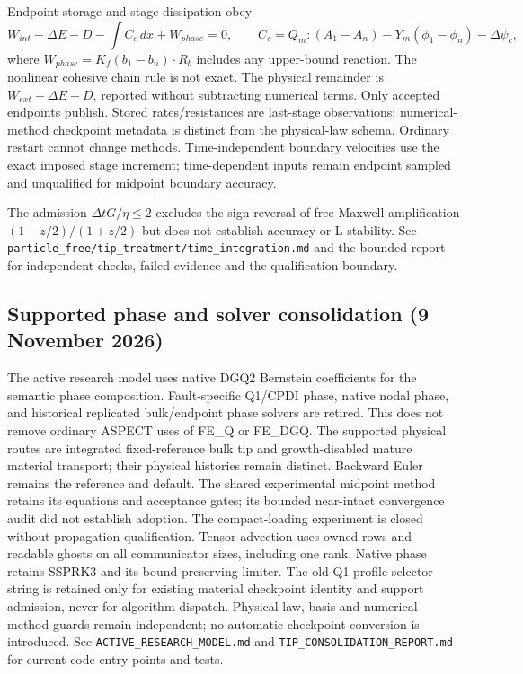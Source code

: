 \documentclass[11pt]{article}
\begin{document}
Endpoint storage and stage dissipation obey
\[
 W_{int}-\Delta E-D-\int C_c\,dx+W_{phase}=0,\qquad
 C_c=Q_m:(A_1-A_n)-Y_m(\phi_1-\phi_n)-\Delta\psi_c,
\]
where $W_{phase}=K_f(b_1-b_n)\cdot R_b$ includes any upper-bound reaction.
The nonlinear cohesive chain rule is not exact. The physical remainder is
$W_{ext}-\Delta E-D$, reported without subtracting numerical terms. Only accepted
endpoints publish. Stored rates/resistances are last-stage observations;
numerical-method checkpoint metadata is distinct from the physical-law schema.
Ordinary restart cannot change methods. Time-independent boundary velocities
use the exact imposed stage increment; time-dependent inputs remain endpoint
sampled and unqualified for midpoint boundary accuracy.

The admission $\Delta tG/\eta\le2$ excludes the sign reversal of free Maxwell
amplification $(1-z/2)/(1+z/2)$ but does not establish accuracy or L-stability.
See \texttt{particle\_free/tip\_treatment/time\_integration.md} and the bounded
report for independent checks, failed evidence and the qualification boundary.


\subsection{Supported phase and solver consolidation (9 November 2026)}
The active research model uses native DGQ2 Bernstein coefficients for the
semantic phase composition. Fault-specific Q1/CPDI phase, native nodal phase,
and historical replicated bulk/endpoint phase solvers are retired. This does
not remove ordinary ASPECT uses of FE\_Q or FE\_DGQ. The supported physical
routes are integrated fixed-reference bulk tip and growth-disabled mature
material transport; their physical histories remain distinct.
Backward Euler remains the reference and default. The shared experimental
midpoint method retains its equations and acceptance gates; its bounded
near-intact convergence audit did not establish adoption. The compact-loading
experiment is closed without propagation qualification.
Tensor advection uses owned rows and readable ghosts on all communicator sizes,
including one rank. Native phase retains SSPRK3 and its bound-preserving limiter.
The old Q1 profile-selector string is retained only for existing material
checkpoint identity and support admission, never for algorithm dispatch.
Physical-law, basis and numerical-method guards remain independent; no automatic
checkpoint conversion is introduced. See \texttt{ACTIVE\_RESEARCH\_MODEL.md}
and \texttt{TIP\_CONSOLIDATION\_REPORT.md} for current code entry points and tests.
\end{document}
